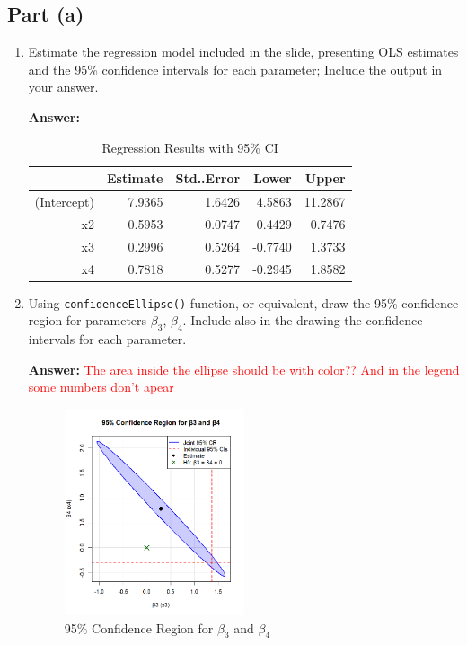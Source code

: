 \documentclass[12pt,a4paper]{article}
\begin{document}
\subsection*{Part (a)}
\begin{enumerate}[label=(\roman*)]
  \item Estimate the regression model included in the slide, presenting OLS estimates and the 95\% confidence intervals for each parameter; Include the output in your answer.
  
  \textbf{Answer:} 
 
\begin{table}[ht]
    \centering
    \caption{Regression Results with 95\% CI} 
    \label{tab:regression}
  \begin{tabular}{rrrrr}
    \hline
    & Estimate & Std..Error & Lower & Upper \\ 
    \hline
    (Intercept) & 7.9365 & 1.6426 & 4.5863 & 11.2867 \\ 
    x2 & 0.5953 & 0.0747 & 0.4429 & 0.7476 \\ 
    x3 & 0.2996 & 0.5264 & -0.7740 & 1.3733 \\ 
    x4 & 0.7818 & 0.5277 & -0.2945 & 1.8582 \\ 
    \hline
  \end{tabular}
\end{table}

  
  \item Using \texttt{confidenceEllipse()} function, or equivalent, draw the 95\% confidence region for parameters $\beta_3$, $\beta_4$. Include also in the drawing the confidence intervals for each parameter.
  
  \textbf{Answer:} \textcolor{red}{The area inside the ellipse should be with color?? And in the legend some numbers don't apear}


    \begin{figure}[H]  
      \centering
      \includegraphics[width=0.5\textwidth]{Files/q1ii_plot.png}
      \caption{95\% Confidence Region for $\beta_3$ and $\beta_4$}
      \label{fig:ellipse}
    \end{figure}


\end{enumerate}
\end{document}
